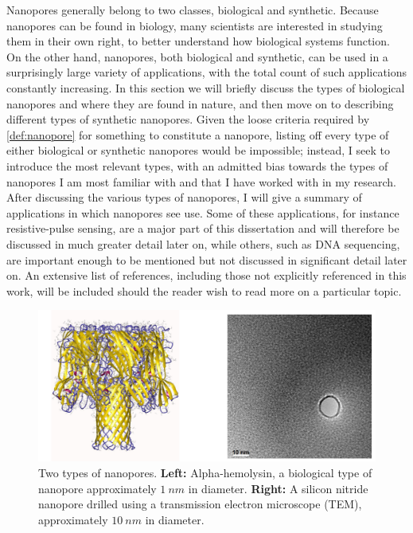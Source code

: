 		Nanopores generally belong to two classes, biological and synthetic. Because nanopores can be found in biology, many scientists are interested in studying them in their own right, to better understand how biological systems function. On the other hand, nanopores, both biological and synthetic, can be used in a surprisingly large variety of applications, with the total count of such applications constantly increasing. In this section we will briefly discuss the types of biological nanopores and where they are found in nature, and then move on to describing different types of synthetic nanopores. Given the loose criteria required by \ref{def:nanopore} for something to constitute a nanopore, listing off every type of either biological or synthetic nanopores would be impossible; instead, I seek to introduce the most relevant types, with an admitted bias towards the types of nanopores I am most familiar with and that I have worked with in my research. After discussing the various types of nanopores, I will give a summary of applications in which nanopores see use. Some of these applications, for instance resistive-pulse sensing, are a major part of this dissertation and will therefore be discussed in much greater detail later on, while others, such as DNA sequencing, are important enough to be mentioned but not discussed in significant detail later on. An extensive list of references, including those not explicitly referenced in this work, will be included should the reader wish to read more on a particular topic.

		\begin{figure}[h]
			\includegraphics[width=\textwidth]{bio_synth_nanopores.png}
			\caption{Two types of nanopores. \textbf{Left:} Alpha-hemolysin, a biological type of nanopore approximately $\SI{1}{nm}$ in diameter. \textbf{Right:} A silicon nitride nanopore drilled using a transmission electron microscope (TEM), approximately $\SI{10}{nm}$ in diameter.}
		\end{figure}

